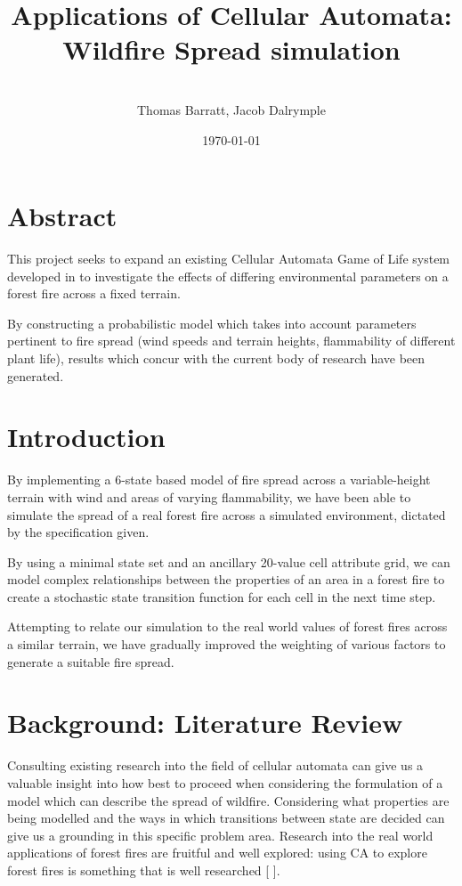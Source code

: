 \documentclass[11pt, a4paper, titlepage]{article}
\date{}
\title{ \textbf{Applications of Cellular Automata: Wildfire Spread simulation} \\  }
\author{\\ \Large{Thomas Barratt, Jacob Dalrymple  } }
\date{\today}
\begin{document}
\maketitle 

\newpage

\section{Abstract}
This project seeks to expand an existing Cellular Automata Game of Life system developed in \cite{capyle_home_2016} to investigate the effects of differing environmental parameters on a forest fire across a fixed terrain.

By constructing a probabilistic model which takes into account parameters pertinent to fire spread (wind speeds and terrain heights, flammability of different plant life), results which concur with the current body of research have been generated.

\section{Introduction}
By implementing a 6-state based model of fire spread across a variable-height terrain with wind and areas of varying flammability, we have been able to simulate the spread of a real forest fire across a simulated environment, dictated by the specification given.

By using a minimal state set and an ancillary 20-value cell attribute grid, we can model complex relationships between the properties of an area in a forest fire to create a stochastic state transition function for each cell in the next time step.

Attempting to relate our simulation to the real world values of forest fires across a similar terrain, we have gradually improved the weighting of various factors to generate a suitable fire spread. 
\section{Background: Literature Review}
Consulting existing research into the field of cellular automata can give us a valuable insight into how best to proceed when considering the formulation of a model which can describe the spread of wildfire. Considering what properties are being modelled and the ways in which transitions between state are decided can give us a grounding in this specific problem area. Research into the real world applications of forest fires are fruitful and well explored: using CA to explore forest fires is something that is well researched [\cite{ntinas2017parallel}
\cite{clarke1994cellular}
\cite{trunfio2011new}].
\end{document}
